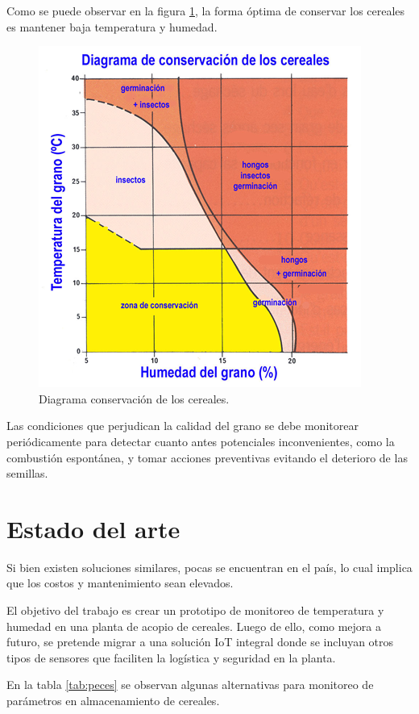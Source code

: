 Como se puede observar en la figura \ref{fig:tempHum}, la forma óptima de conservar los cereales es mantener baja temperatura y humedad.

\begin{figure}[htbp]
	\centering
	\includegraphics[width=.5\textwidth]{./Figures/DiagramaDeConservacionGranos.png}
	\caption{Diagrama conservación de los cereales.\protect\footnotemark}
	\label{fig:tempHum}
\end{figure}

Las condiciones que perjudican la calidad del grano se debe monitorear periódicamente para detectar cuanto antes potenciales inconvenientes, como la combustión espontánea, y tomar acciones preventivas evitando el deterioro de las semillas. \citep{WEBSITE:5}

\section{Estado del arte}

Si bien existen soluciones similares, pocas se encuentran en el país, lo cual implica que los costos y mantenimiento sean elevados. 

El objetivo del trabajo es crear un prototipo de monitoreo de temperatura y humedad en una planta de acopio de cereales. Luego de ello, como mejora a futuro, se pretende migrar a una solución IoT integral donde se incluyan otros tipos de sensores que faciliten la logística y seguridad en la planta. 

En la tabla \ref{tab:peces} se observan algunas alternativas para monitoreo de parámetros en almacenamiento de cereales.

